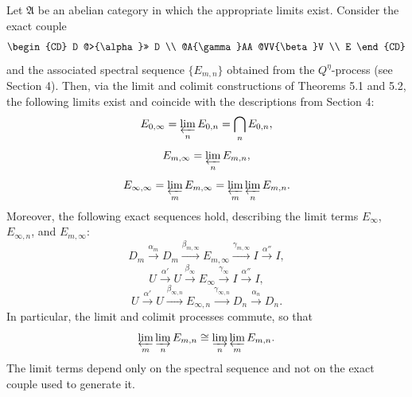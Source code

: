 Let $\mathfrak{A}$ be an abelian category in which the appropriate limits exist. Consider the exact couple
$$
\begin{CD}
D @>{\alpha}>> D \\
@A{\gamma}AA @VV{\beta}V \\
E
\end{CD}
$$
and the associated spectral sequence $\{E_{m,n}\}$ obtained from the $Q^{\eta}$-process (see Section 4). Then, via the limit and colimit constructions of Theorems 5.1 and 5.2, the following limits exist and coincide with the descriptions from Section 4:
$$
E_{0,\infty} = \varprojlim_n E_{0,n} = \bigcap_n E_{0,n},
$$
$$
E_{m,\infty} = \varprojlim_n E_{m,n},
$$
$$
E_{\infty,\infty} = \varprojlim_m E_{m,\infty} = \varprojlim_m \varprojlim_n E_{m,n}.
$$
Moreover, the following exact sequences hold, describing the limit terms $E_{\infty}$, $E_{\infty,n}$, and $E_{m,\infty}$:
$$
D_m \xrightarrow{\alpha_m} D_m \xrightarrow{\beta_{m,\infty}} E_{m,\infty} \xrightarrow{\gamma_{m,\infty}} I \xrightarrow{\alpha''} I,
$$
$$
U \xrightarrow{\alpha'} U \xrightarrow{\beta_{\infty}} E_{\infty} \xrightarrow{\gamma_{\infty}} I \xrightarrow{\alpha''} I,
$$
$$
U \xrightarrow{\alpha'} U \xrightarrow{\beta_{\infty,n}} E_{\infty,n} \xrightarrow{\gamma_{\infty,n}} D_n \xrightarrow{\alpha_n} D_n.
$$
In particular, the limit and colimit processes commute, so that
$$
\varprojlim_m \varinjlim_n E_{m,n} \cong \varinjlim_n \varprojlim_m E_{m,n}.
$$
The limit terms depend only on the spectral sequence and not on the exact couple used to generate it.